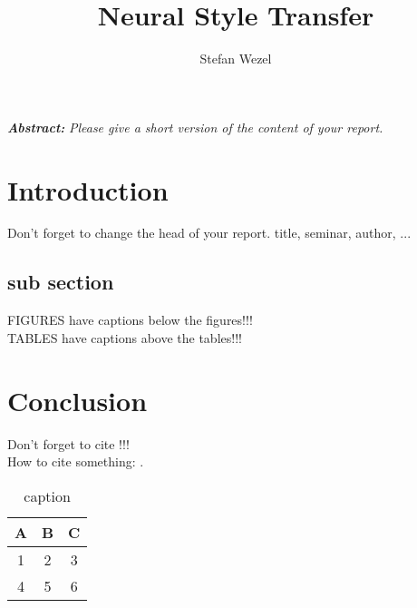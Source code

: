 \documentclass{seminar}
\begin{document}
\renewcommand\toptitle{Seminar: ,,Multimedia-Standards im Internet``}
\title{Neural Style Transfer}
\author{Stefan Wezel}
\maketitle


\addvspace{0.5cm}
\emph{\bfseries{Abstract:}}
\emph{Please give a short version of the content of your report.}


\tableofcontents
\newpage

\section{Introduction}
Don't forget to change the head of your report. title, seminar, author, ...

\subsection{sub section}
FIGURES have captions below the figures!!!\\
TABLES have captions above the tables!!!\\

\section{Conclusion}
Don't forget to cite !!!\\
How to cite something: \cite{Subramanian2005, Bjoerkholm2009}.



  \begin{table}
  \caption{caption}
  \begin{tabular}{|c|c|c|}
\hline
 A & B & C \\
\hline
 1 & 2 & 3  \\
\hline 
 4 & 5 & 6 \\
\hline
\end{tabular}
  \end{table}


\newpage






\end{document}
